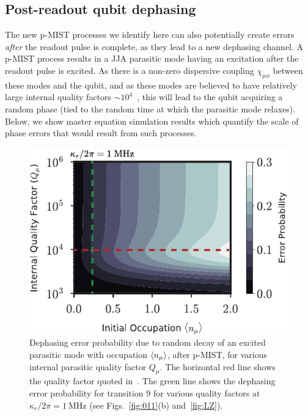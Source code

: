 \documentclass[%
reprint,
superscriptaddress,
 amsmath,amssymb,
 aps,
 prx,
longbibliography,
floatfix,
]{revtex4-2}
\begin{document}
\subsection{Post-readout qubit dephasing}\label{sec:dephasing}

The new p-MIST processes we identify here can also potentially create errors \textit{after} the readout pulse is complete, as they lead to a new dephasing channel.  A p-MIST process results in a JJA parasitic mode having an excitation after the readout pulse is excited.  As there is a non-zero dispersive coupling 
$\chi_{\mu \phi}$ between these modes and the qubit, and as these modes are believed to have relatively large internal quality factors $\sim 10^{4}$~\cite{masluk_microwave_2012, masluk2013reducing}, this will lead to the qubit acquiring a random phase (tied to the random time at which the parasitic mode relaxes).  Below, we show master equation simulation results which quantify the
scale of phase errors that would result from such processes. 

\begin{figure}[htb]
    \centering
    \includegraphics[width=\linewidth]{Figures/dephasing.pdf}
    \caption{Dephasing error probability due to random decay of an excited parasitic mode with occupation $\braket{n_\mu}$, after p-MIST, for various internal parasitic quality factor $Q_\mu$. The horizontal red line shows the quality factor quoted in~\cite{masluk_microwave_2012}. The green line shows the dephasing error probability for transition $9$ for various quality factors at $\kappa_r/2\pi=1 \ \mathrm{MHz}$ (see Figs.~\ref{fig:011}(b) and~\ref{fig:LZ}).}
    \label{fig:dephasing}
\end{figure}
\end{document}
